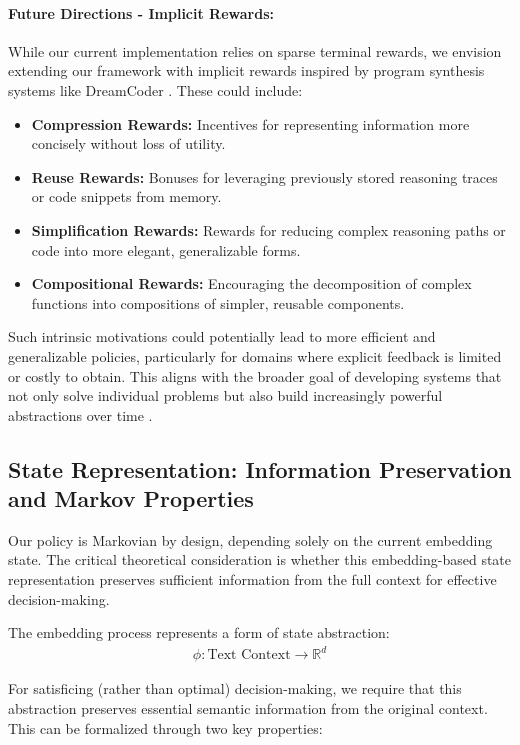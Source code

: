 \documentclass[10pt,journal,compsoc]{IEEEtran}
\begin{document}
\begin{itemize}
  \paragraph{Future Directions - Implicit Rewards:}
  While our current implementation relies on sparse terminal rewards, we envision extending our framework with implicit rewards inspired by program synthesis systems like DreamCoder \citep{ellis2021dreamcoder}. These could include:
  \begin{itemize}
    \item \textbf{Compression Rewards:} Incentives for representing information more concisely without loss of utility.
    \item \textbf{Reuse Rewards:} Bonuses for leveraging previously stored reasoning traces or code snippets from memory.
    \item \textbf{Simplification Rewards:} Rewards for reducing complex reasoning paths or code into more elegant, generalizable forms.
    \item \textbf{Compositional Rewards:} Encouraging the decomposition of complex functions into compositions of simpler, reusable components.
  \end{itemize}
  
  Such intrinsic motivations could potentially lead to more efficient and generalizable policies, particularly for domains where explicit feedback is limited or costly to obtain. This aligns with the broader goal of developing systems that not only solve individual problems but also build increasingly powerful abstractions over time \citep{lake2017building}.
\end{itemize}

\subsection{State Representation: Information Preservation and Markov Properties}

Our policy is Markovian by design, depending solely on the current embedding state. The critical theoretical consideration is whether this embedding-based state representation preserves sufficient information from the full context for effective decision-making.

The embedding process represents a form of state abstraction:
\begin{align}
\phi: \text{Text Context} \rightarrow \mathbb{R}^d
\end{align}

For satisficing (rather than optimal) decision-making, we require that this abstraction preserves essential semantic information from the original context. This can be formalized through two key properties:
\end{document}
